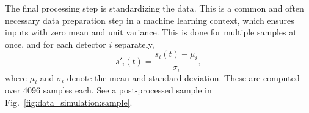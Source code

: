 The final processing step is standardizing the data. This is a common and often necessary data preparation step in a machine learning context, which ensures inputs with zero mean and unit variance. This is done for multiple samples at once, and for each detector  $i$ separately,
\begin{equation}
	s'_i(t) = \frac{s_i(t)-\mu_i}{\sigma_i},
\end{equation}
where $\mu_i$ and $\sigma_i$ denote the mean and standard deviation. These are computed over \SI{4096}{\nothing} samples each. See a post-processed sample in Fig.~\ref{fig:data_simulation:sample}. 

